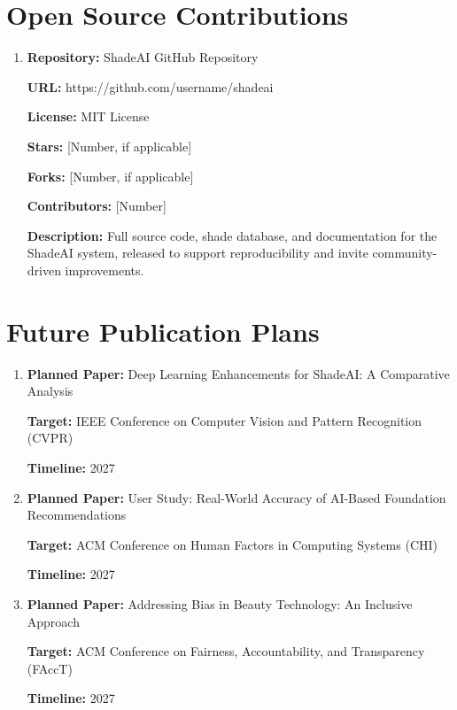 \section{Open Source Contributions}

\begin{enumerate}
    \item \textbf{Repository:} ShadeAI GitHub Repository
    
    \textbf{URL:} https://github.com/username/shadeai
    
    \textbf{License:} MIT License
    
    \textbf{Stars:} [Number, if applicable]
    
    \textbf{Forks:} [Number, if applicable]
    
    \textbf{Contributors:} [Number]
    
    \textbf{Description:} Full source code, shade database, and documentation for the ShadeAI system, released to support reproducibility and invite community-driven improvements.
\end{enumerate}

\section{Future Publication Plans}

\begin{enumerate}
    \item \textbf{Planned Paper:} Deep Learning Enhancements for ShadeAI: A Comparative Analysis
    
    \textbf{Target:} IEEE Conference on Computer Vision and Pattern Recognition (CVPR)
    
    \textbf{Timeline:} 2027
    
    \vspace{0.5cm}
    
    \item \textbf{Planned Paper:} User Study: Real-World Accuracy of AI-Based Foundation Recommendations
    
    \textbf{Target:} ACM Conference on Human Factors in Computing Systems (CHI)
    
    \textbf{Timeline:} 2027
    
    \vspace{0.5cm}
    
    \item \textbf{Planned Paper:} Addressing Bias in Beauty Technology: An Inclusive Approach
    
    \textbf{Target:} ACM Conference on Fairness, Accountability, and Transparency (FAccT)
    
    \textbf{Timeline:} 2027
\end{enumerate}


